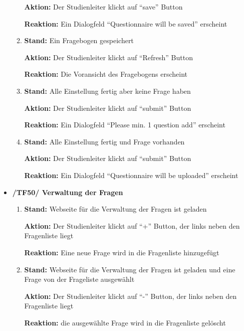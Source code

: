 \documentclass[a4paper]{scrreprt}
\begin{document}
\begin{itemize}
\begin{enumerate}
                              \par \textbf{Aktion: }Der \gls{Studienleiter} klickt auf ``save'' Button
                              \par \textbf{Reaktion: }Ein Dialogfeld ``Questionnaire will be saved'' erscheint
                        \item \par \textbf{Stand: }Ein Fragebogen gespeichert
                              \par \textbf{Aktion: }Der \gls{Studienleiter} klickt auf ``Refresh'' Button
                              \par \textbf{Reaktion: }Die Voransicht des Fragebogens erscheint
                        \item \par \textbf{Stand: }Alle Einstellung fertig aber keine Frage haben
                              \par \textbf{Aktion: }Der \gls{Studienleiter} klickt auf ``submit'' Button
                              \par \textbf{Reaktion: }Ein Dialogfeld ``Please min. 1 question add'' erscheint
                        \item \par \textbf{Stand: }Alle Einstellung fertig und Frage vorhanden
                              \par \textbf{Aktion: }Der \gls{Studienleiter} klickt auf ``submit'' Button
                              \par \textbf{Reaktion: }Ein Dialogfeld ``Questionnaire will be uploaded'' erscheint
                    \end{enumerate}

                \item \textbf{/TF50/ Verwaltung der Fragen}
                        \begin{enumerate}
                        \item \par \textbf{Stand: } Webseite für die Verwaltung der Fragen ist geladen
                              \par \textbf{Aktion: } Der \gls{Studienleiter} klickt auf ``+'' Button, der links neben den Fragenliste liegt
                              \par \textbf{Reaktion: } Eine neue Frage wird in die Fragenliste hinzugefügt

                        \item \par \textbf{Stand: } Webseite für die Verwaltung der Fragen ist geladen und eine Frage von der Frageliste ausgewählt
                              \par \textbf{Aktion: }  Der \gls{Studienleiter} klickt auf ``-'' Button, der links neben den Fragenliste liegt
                              \par \textbf{Reaktion: } die ausgewählte Frage wird in die Fragenliste gelöscht


\end{enumerate}
\end{itemize}
\end{document}
